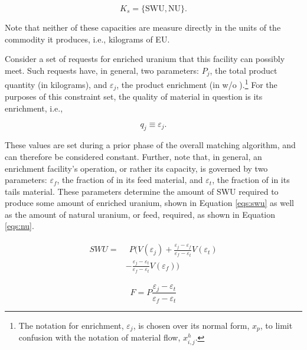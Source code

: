 \begin{equation}\label{eqs:enr-constr-commods}
  K_{s} = \{ \mbox{SWU}, \mbox{NU} \}.
\end{equation}

Note that neither of these capacities are measure directly in the units of the
commodity it produces, i.e., kilograms of EU.

Consider a set of requests for enriched uranium that this facility can possibly
meet. Such requests have, in general, two parameters: $P_{j}$, the total product
quantity (in kilograms), and $\varepsilon_{j}$, the product enrichment (in w/o
).\footnote{The notation for enrichment, $\varepsilon_{j}$, is
  chosen over its normal form, $x_p$, to limit confusion with the notation of
  material flow, $x^h_{i,j}$.}  For the purposes of this constraint set, the
quality of material in question is its enrichment, i.e.,

\begin{equation}\label{eqs:enr-q-swu}
  q_{j} \equiv \varepsilon_{j}.
\end{equation}

These values are set during a prior phase of the overall matching algorithm, and
can therefore be considered constant. Further, note that, in general, an
enrichment facility's operation, or rather its capacity, is governed by two
parameters: $\varepsilon_{f}$, the fraction of  in its feed
material, and $\varepsilon_{t}$, the fraction of  in its tails
material. These parameters determine the amount of SWU required to produce some
amount of enriched uranium, shown in Equation \ref{eqs:swu} as well as the
amount of natural uranium, or feed, required, as shown in Equation \ref{eqs:nu}.

\begin{align}
\begin{split}
\label{eqs:swu}
SWU = & \:\: P ( V(\varepsilon_{j}) 
      + \frac{\varepsilon_{j} - \varepsilon_{f}}
               {\varepsilon_{f} - \varepsilon_{t}} V(\varepsilon_{t}) \\
      & - \frac{\varepsilon_{j} - \varepsilon_{t}}
               {\varepsilon_{f} - \varepsilon_{t}} V(\varepsilon_{f}) )
\end{split}
\end{align}

\begin{equation}
\label{eqs:nu}
F = P \frac{\varepsilon_{j} - \varepsilon_{t}}
           {\varepsilon_{f} - \varepsilon_{t}}
\end{equation}

